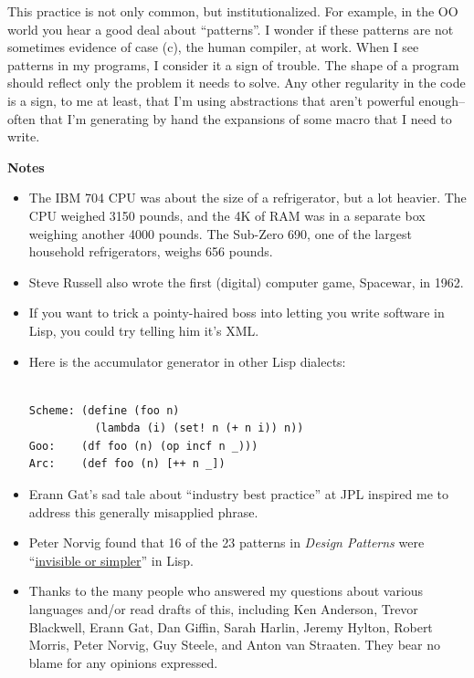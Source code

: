 This practice is not only common, but institutionalized. For example, in
the OO world you hear a good deal about ``patterns''. I wonder if these
patterns are not sometimes evidence of case (c), the human compiler, at
work. When I see patterns in my programs, I consider it a sign of
trouble. The shape of a program should reflect only the problem it needs
to solve. Any other regularity in the code is a sign, to me at least,
that I'm using abstractions that aren't powerful enough-- often that I'm
generating by hand the expansions of some macro that I need to write.

\textbf{Notes}

\begin{itemize}
\item
  The IBM 704 CPU was about the size of a refrigerator, but a lot
  heavier. The CPU weighed 3150 pounds, and the 4K of RAM was in a
  separate box weighing another 4000 pounds. The Sub-Zero 690, one of
  the largest household refrigerators, weighs 656 pounds.
\item
  Steve Russell also wrote the first (digital) computer game, Spacewar,
  in 1962.
\item
  If you want to trick a pointy-haired boss into letting you write
  software in Lisp, you could try telling him it's XML.
\item
  Here is the accumulator generator in other Lisp dialects:

\begin{verbatim}

Scheme: (define (foo n) 
          (lambda (i) (set! n (+ n i)) n))
Goo:    (df foo (n) (op incf n _)))
Arc:    (def foo (n) [++ n _])
\end{verbatim}
\item
  Erann Gat's sad tale about ``industry best practice'' at JPL inspired
  me to address this generally misapplied phrase.
\item
  Peter Norvig found that 16 of the 23 patterns in \emph{Design
  Patterns} were
  ``\href{http://www.norvig.com/design-patterns/}{invisible or
  simpler}'' in Lisp.
\item
  Thanks to the many people who answered my questions about various
  languages and/or read drafts of this, including Ken Anderson, Trevor
  Blackwell, Erann Gat, Dan Giffin, Sarah Harlin, Jeremy Hylton, Robert
  Morris, Peter Norvig, Guy Steele, and Anton van Straaten. They bear no
  blame for any opinions expressed.
\end{itemize}

